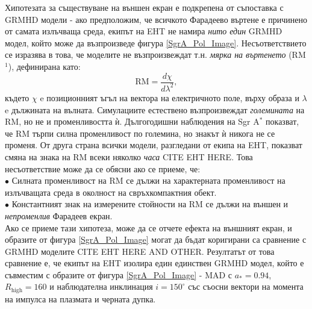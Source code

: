 Хипотезата за съществуване на външен екран е подкрепена от съпоставка с GRMHD модели - ако предположим, че всичкото Фарадеево въртене е причинено от самата излъчваща среда, екипът на EHT не намира \emph{нито един} GRMHD модел, който може да възпроизведе фигура \ref{SgrA_Pol_Image}. Несъответствието се изразява в това, че моделите не възпроизвеждат т.н. \emph{мярка на въртенето} (RM$^1$), дефинирана като:
\begin{equation}
	\text{RM} = \frac{d\chi}{d\lambda^2},
\end{equation}
където $\chi$ e позиционният ъгъл на вектора на електричното поле, върху образа и $\lambda$ e дължината на вълната. Симулациите естествено възпроизвеждат \emph{големината} на RM, но не и променливостта ѝ. Дългогодишни наблюдения на Sgr A$^*$ показват, че RM търпи силна променливост по големина, но знакът ѝ никога не се променя. От друга страна всички модели, разгледани от екипа на EHT, показват смяна на знака на RM всеки няколко \emph{часа} CITE EHT HERE. Това несъответствие може да се обясни ако се приеме, че:\\\newline
$\bullet$ Силната променливост на RM се дължи на характерната променливост на излъчващата среда в околност на свръхкомпактния обект.\\\newline
$\bullet$ Константният знак на измерените стойности на RM се дължи на външен и \emph{непроменлив} Фарадеев екран.\\

Ако се приеме тази хипотеза, може да се отчете ефекта на външният екран, и образите от фигура \ref{SgrA_Pol_Image} могат да бъдат коригирани са сравнение с GRMHD моделите CITE EHT HERE AND OTHER. Резултатът от това сравнение е, че екипът на EHT изолира един единствен GRMHD модел, който е съвместим с образите от фигура \ref{SgrA_Pol_Image} - MAD с $a_* = 0.94$, $R_\text{high} = 160$ и наблюдателна инклинация $i = 150^\circ$ със съосни вектори на момента на импулса на плазмата и черната дупка.
 \setlength{\footskip}{0pt}
